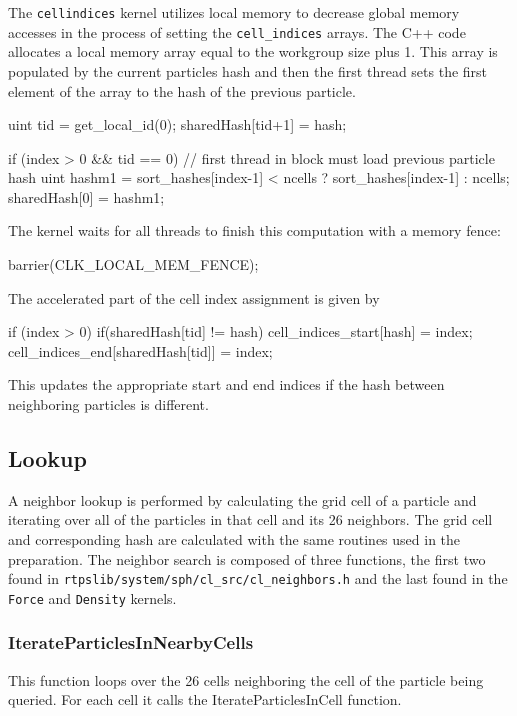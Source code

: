 The \verb|cellindices| kernel utilizes local memory to decrease global memory
accesses in the process of setting the \verb|cell_indices| arrays. 
The C++ code allocates a local memory array equal to the workgroup size plus 1.
This array is populated by the current particles hash and then the first thread
sets the first element of the array to the hash of the previous particle.
\begin{cppcode}{0}
uint tid = get_local_id(0);
sharedHash[tid+1] = hash; 

if (index > 0 && tid == 0)
{   
    // first thread in block must load previous particle hash
    uint hashm1 = sort_hashes[index-1] < ncells ? sort_hashes[index-1] : ncells;
    sharedHash[0] = hashm1;
}
\end{cppcode}

The kernel waits for all threads to finish this computation with a memory fence:
\begin{cppcode}{0}
barrier(CLK_LOCAL_MEM_FENCE);
\end{cppcode}

The accelerated part of the cell index assignment is given by 
\begin{cppcode}{0}
if (index > 0)
{
    if(sharedHash[tid] != hash)
    {
        cell_indices_start[hash] = index;
        cell_indices_end[sharedHash[tid]] = index;
    }
}
\end{cppcode}

This updates the appropriate start and end indices if the hash between
neighboring particles is different.

\subsection{Lookup}
A neighbor lookup is performed by calculating the grid cell of a particle and
iterating over all of the particles in that cell and its 26 neighbors. The grid
cell and corresponding hash are calculated with the same routines used in the
preparation. The neighbor search is composed of three functions, the first two
found in \verb|rtpslib/system/sph/cl_src/cl_neighbors.h| and the last found in
the \verb|Force| and \verb|Density| kernels.

\subsubsection{IterateParticlesInNearbyCells}
This function loops over the 26 cells neighboring the cell of the particle
being queried. For each cell it calls the IterateParticlesInCell function.

